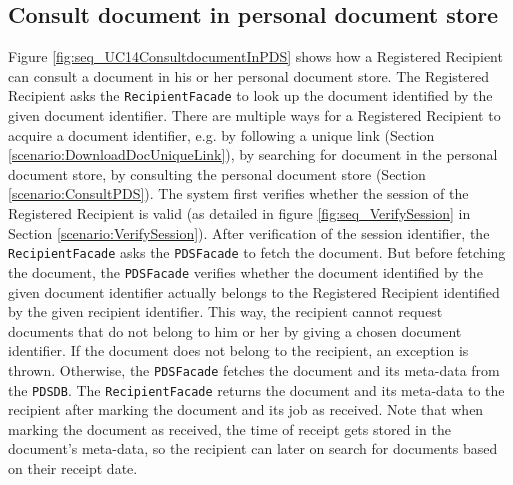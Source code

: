 \documentclass[a4paper,10pt]{article}
\begin{document}
\subsection{Consult document in personal document store}
\label{scenario:ConsultDocInPDS}
Figure \ref{fig:seq_UC14ConsultdocumentInPDS} shows how a Registered Recipient can consult a document in his or her personal document store. The Registered Recipient asks the \texttt{RecipientFacade} to look up the document identified by the given document identifier.  There are multiple ways for a Registered Recipient to acquire a document identifier, e.g. by following a unique link (Section \ref{scenario:DownloadDocUniqueLink}), by searching for document in the personal document store, by consulting the personal document store (Section \ref{scenario:ConsultPDS}). The system first verifies whether the session of the Registered Recipient is valid (as detailed in figure \ref{fig:seq_VerifySession} in Section \ref{scenario:VerifySession}). After verification of the session identifier, the \texttt{RecipientFacade} asks the \texttt{PDSFacade} to fetch the document. But before fetching the document, the \texttt{PDSFacade} verifies whether the document identified by the given document identifier actually belongs to the Registered Recipient identified by the given recipient identifier. This way, the recipient cannot request documents that do not belong to him or her by giving a chosen document identifier. If the document does not belong to the recipient, an exception is thrown. Otherwise, the \texttt{PDSFacade} fetches the document and its meta-data from the \texttt{PDSDB}. The \texttt{RecipientFacade} returns the document and its meta-data to the recipient after marking the document and its job as received. Note that when marking the document as received, the time of receipt gets stored in the document's meta-data, so the recipient can later on search for documents based on their receipt date.
\end{document}
